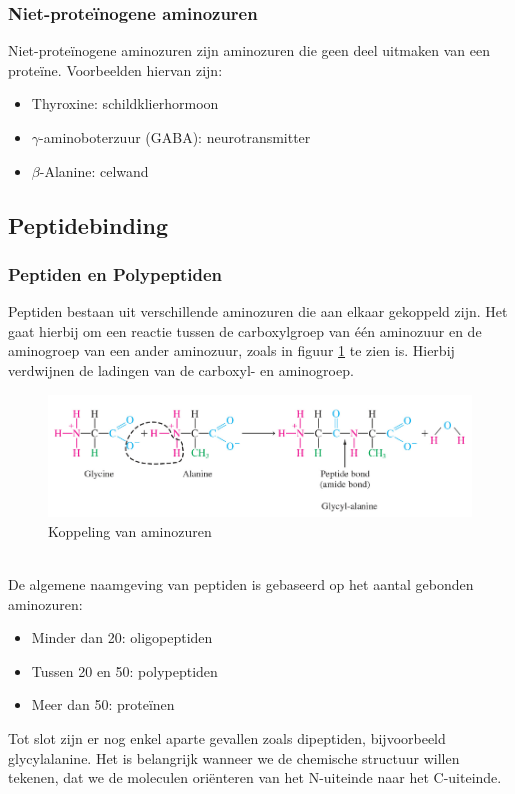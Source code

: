 \documentclass[a4paper,kul]{kulakarticle} %
\begin{document}
\subsubsection{Niet-proteïnogene aminozuren}
Niet-proteïnogene aminozuren zijn aminozuren die geen deel uitmaken van een proteïne. Voorbeelden hiervan zijn:
\begin{itemize}
	\item Thyroxine: schildklierhormoon
	\item $\gamma$-aminoboterzuur (GABA): neurotransmitter
	\item $\beta$-Alanine: celwand
\end{itemize}

\subsection{Peptidebinding}
\subsubsection{Peptiden en Polypeptiden}
Peptiden bestaan uit verschillende aminozuren die aan elkaar gekoppeld zijn. Het gaat hierbij om een reactie tussen de carboxylgroep van één aminozuur en de aminogroep van een ander aminozuur, zoals in figuur \ref{fig:reactiepeptiden} te zien is. Hierbij verdwijnen de ladingen van de carboxyl- en aminogroep.
\begin{figure}[h]
	\centering
	\includegraphics[width=0.7\linewidth]{ReactiePeptiden}
	\caption[Reactie peptiden]{Koppeling van aminozuren}
	\label{fig:reactiepeptiden}
\end{figure}\\
De algemene naamgeving van peptiden is gebaseerd op het aantal gebonden aminozuren: 
\begin{itemize}
	\item Minder dan 20: oligopeptiden
	\item Tussen 20 en 50: polypeptiden
	\item Meer dan 50: proteïnen
\end{itemize} 
Tot slot zijn er nog enkel aparte gevallen zoals dipeptiden, bijvoorbeeld glycylalanine. Het is belangrijk wanneer we de chemische structuur willen tekenen, dat we de moleculen oriënteren van het N-uiteinde naar het C-uiteinde.
\end{document}
